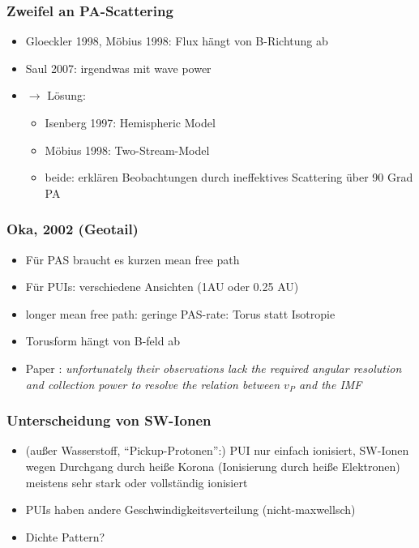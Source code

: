 \documentclass[]{article}
\begin{document}
\subsubsection{Zweifel an PA-Scattering}
\begin{itemize}
	\item Gloeckler 1998, Möbius 1998: Flux hängt von B-Richtung ab
	\item Saul 2007: irgendwas mit wave power
	\item $\rightarrow$ Lösung: \begin{itemize}
	\item Isenberg 1997: Hemispheric Model
	\item Möbius 1998: Two-Stream-Model
	\item beide: erklären Beobachtungen durch ineffektives Scattering über 90 Grad PA
\end{itemize}	 
\end{itemize}
%
\subsubsection{Oka, 2002 (Geotail)}
\begin{itemize}
	\item Für PAS braucht es kurzen mean free path
	\item Für PUIs: verschiedene Ansichten (1AU oder 0.25 AU)
	\item longer mean free path: geringe PAS-rate: Torus statt Isotropie
	\item Torusform hängt von B-feld ab
	\item Paper \cite{drews_2013}: \textit{unfortunately their observations lack the required angular resolution and collection power to resolve the relation between $v_P$ and the IMF}
\end{itemize}
%
\subsubsection{Unterscheidung von SW-Ionen}
\begin{itemize}
	\item (außer Wasserstoff, ``Pickup-Protonen'':) PUI nur einfach ionisiert, SW-Ionen wegen Durchgang durch heiße Korona (Ionisierung durch heiße Elektronen) meistens sehr stark oder vollständig ionisiert 
	\item PUIs haben andere Geschwindigkeitsverteilung (nicht-maxwellsch)
	\item Dichte Pattern?
\end{itemize}
%
\end{document}
